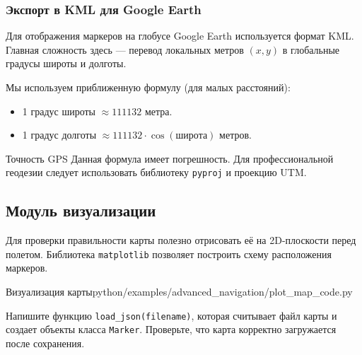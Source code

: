 \subsubsection{Экспорт в KML для Google Earth}
Для отображения маркеров на глобусе Google Earth используется формат KML. Главная сложность здесь — перевод локальных метров $(x, y)$ в глобальные градусы широты и долготы.

Мы используем приближенную формулу (для малых расстояний):
\begin{itemize}
    \item 1 градус широты $\approx 111132$ метра.
    \item 1 градус долготы $\approx 111132 \cdot \cos(\text{широта})$ метров.
\end{itemize}

\begin{warnbox}{Точность GPS}
Данная формула имеет погрешность. Для профессиональной геодезии следует использовать библиотеку \texttt{pyproj} и проекцию UTM.
\end{warnbox}

\subsection{Модуль визуализации}
Для проверки правильности карты полезно отрисовать её на 2D-плоскости перед полетом. Библиотека \texttt{matplotlib} позволяет построить схему расположения маркеров.

\begin{codefiletitle}[python]{Визуализация карты}{python/examples/advanced_navigation/plot_map_code.py}
\end{codefiletitle}

\begin{taskbox}
Напишите функцию \texttt{load\_json(filename)}, которая считывает файл карты и создает объекты класса \texttt{Marker}. Проверьте, что карта корректно загружается после сохранения.
\end{taskbox}
